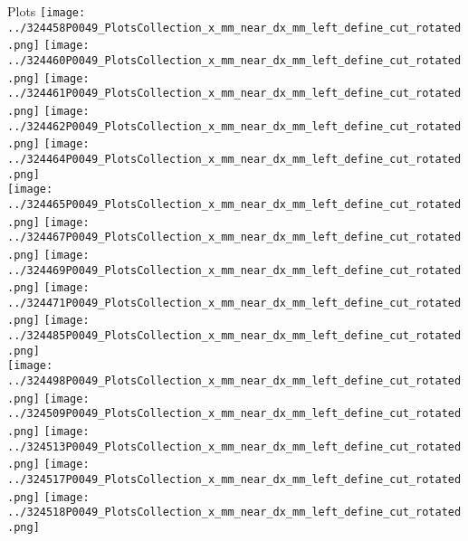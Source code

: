 \documentclass{beamer}
\begin{document}
\begin{frame}\tiny
        \begin{block}{Plots}
		  \centering
                \texttt{[image: ../324458P0049\_PlotsCollection\_x\_mm\_near\_dx\_mm\_left\_define\_cut\_rotated.png]}
                \texttt{[image: ../324460P0049\_PlotsCollection\_x\_mm\_near\_dx\_mm\_left\_define\_cut\_rotated.png]}
                \texttt{[image: ../324461P0049\_PlotsCollection\_x\_mm\_near\_dx\_mm\_left\_define\_cut\_rotated.png]}
                \texttt{[image: ../324462P0049\_PlotsCollection\_x\_mm\_near\_dx\_mm\_left\_define\_cut\_rotated.png]}
                \texttt{[image: ../324464P0049\_PlotsCollection\_x\_mm\_near\_dx\_mm\_left\_define\_cut\_rotated.png]}\\
                \texttt{[image: ../324465P0049\_PlotsCollection\_x\_mm\_near\_dx\_mm\_left\_define\_cut\_rotated.png]}
                \texttt{[image: ../324467P0049\_PlotsCollection\_x\_mm\_near\_dx\_mm\_left\_define\_cut\_rotated.png]}
                \texttt{[image: ../324469P0049\_PlotsCollection\_x\_mm\_near\_dx\_mm\_left\_define\_cut\_rotated.png]}
                \texttt{[image: ../324471P0049\_PlotsCollection\_x\_mm\_near\_dx\_mm\_left\_define\_cut\_rotated.png]}
                \texttt{[image: ../324485P0049\_PlotsCollection\_x\_mm\_near\_dx\_mm\_left\_define\_cut\_rotated.png]}\\
                \texttt{[image: ../324498P0049\_PlotsCollection\_x\_mm\_near\_dx\_mm\_left\_define\_cut\_rotated.png]}
                \texttt{[image: ../324509P0049\_PlotsCollection\_x\_mm\_near\_dx\_mm\_left\_define\_cut\_rotated.png]}
                \texttt{[image: ../324513P0049\_PlotsCollection\_x\_mm\_near\_dx\_mm\_left\_define\_cut\_rotated.png]}
                \texttt{[image: ../324517P0049\_PlotsCollection\_x\_mm\_near\_dx\_mm\_left\_define\_cut\_rotated.png]}
                \texttt{[image: ../324518P0049\_PlotsCollection\_x\_mm\_near\_dx\_mm\_left\_define\_cut\_rotated.png]}\\

\end{block}
\end{frame}
\end{document}
